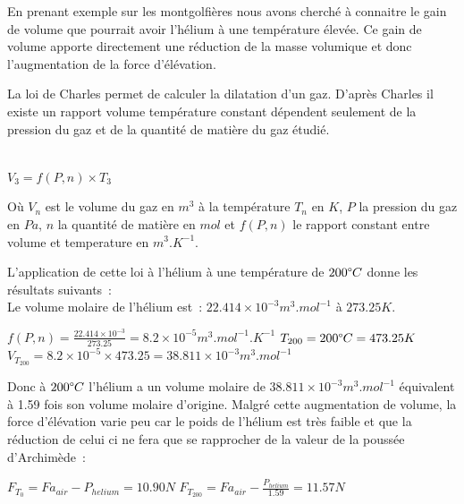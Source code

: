 \documentclass[a4paper,11pt]{article}
\begin{document}
En prenant exemple sur les montgolfières nous avons cherché à connaitre le gain de volume que pourrait avoir l'hélium à une température élevée. Ce gain de volume apporte directement une réduction de la masse volumique et donc l'augmentation de la force d'élévation.

La loi de Charles permet de calculer la dilatation d'un gaz. D'après Charles il existe un rapport volume température constant dépendent seulement de la pression du gaz et de la quantité de matière du gaz étudié.

\begin{center}
  \\
 $\displaystyle{V_3 = f(P, n) \times T_3}$
\end{center}

Où $V_n$ est le volume du gaz en $m^3$ à la température $T_n$ en $K$, $P$ la pression du gaz en $Pa$, $n$ la quantité de matière en $mol$ et $f(P, n)$ le rapport constant entre volume et temperature en $m^3.K^{-1}$.

L'application de cette loi à l'hélium à une température de $200 \degree C $ donne les résultats suivants~: \\

Le volume molaire de l'hélium est~: $22.414\times 10^{-3} m^3.mol^{-1}$ à $273.25K$. \\

\begin{center}
	$\displaystyle{f(P, n) = \frac{22.414\times 10^{-3}}{273.25} = 8.2\times 10^{-5} m^3.mol^{-1}.K^{-1}}$
	\bigbreak
	$T_{200} = 200 \degree C = 473.25K$
	\medbreak
	$\displaystyle{V_{T_{200}} = 8.2\times 10^{-5} \times 473.25 = 38.811 \times 10^{-3}} m^3.mol^{-1}$
\end{center}

Donc à $200 \degree C$ l'hélium a un volume molaire de $38.811 \times 10^{-3} m^3.mol^{-1}$ équivalent à 1.59 fois son volume molaire d'origine. Malgré cette augmentation de volume, la force d'élévation varie peu car le poids de l'hélium est très faible et que la réduction de celui ci ne fera que se rapprocher de la valeur de la poussée d'Archimède~: \\

\begin{center}
  $\displaystyle{F_{T_0} = Fa_{air} - P_{helium} = 10.90 N}$
  \bigbreak
  $\displaystyle{F_{T_{200}} = Fa_{air} - \frac{P_{helium}}{1.59} = 11.57 N}$ \\
\end{center}
\end{document}
